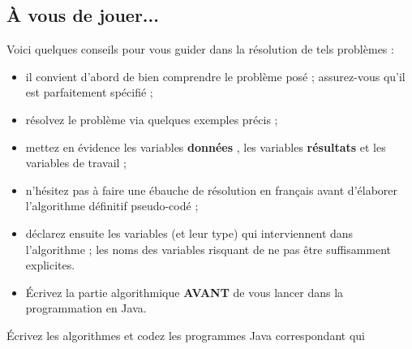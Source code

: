 \documentclass[11pt,a4paper]{article}
\begin{document}
				
            \par
        \subsection{\`A vous de jouer...}
          Voici quelques conseils pour vous guider dans la r\'esolution de tels probl\`emes :
          
					\begin{itemize}
				
			\item il convient d'abord de bien comprendre le probl\`eme pos\'e ; assurez-vous qu'il est parfaitement sp\'ecifi\'e ;
			\item r\'esolvez le probl\`eme via quelques exemples pr\'ecis ;
			\item mettez en \'evidence les variables \textbf{\guillemotleft  donn\'ees \guillemotright }, les variables \textbf{\guillemotleft  r\'esultats \guillemotright } et les variables de travail ;
			\item n'h\'esitez pas \`a faire une \'ebauche de r\'esolution en fran\c cais avant d'\'elaborer l'algorithme d\'efinitif pseudo-cod\'e ;
			\item d\'eclarez ensuite les variables (et leur type) qui interviennent dans l'algorithme ; les noms des variables risquant de ne pas \^etre suffisamment explicites.
			\item \'Ecrivez la partie algorithmique \textbf{AVANT} de vous lancer dans la programmation en Java.
					\end{itemize}
				
            \par
        
        \'Ecrivez les algorithmes et codez les programmes Java correspondant qui 
          
\end{document}
